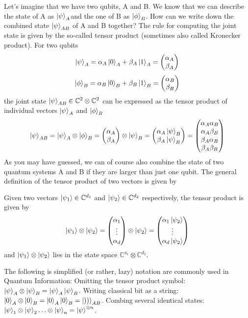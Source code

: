 Let’s imagine that we have two qubits, A and B. We know that we can describe the state of A
as $\ket{\psi}_A$and the one of B as $\ket{\phi}_B$. How can we write down the combined state $\ket{\psi}_{AB}$ of A and B together? The rule for computing the joint state is given by the so-called tensor product (sometimes also called Kronecker product). For two qubits
\[
\ket{\psi}_A=\alpha_A\ket{0}_A+\beta_A\ket{1}_A=\begin{pmatrix} \alpha_A \\ \beta_A \end{pmatrix}
\]
\[
\ket{\phi}_B=\alpha_B\ket{0}_B+\beta_B\ket{1}_B = \begin{pmatrix} \alpha_B \\ \beta_B\end{pmatrix}
\]
the joint state $\ket{\psi}_{AB} \in \mathbb{C}^2 \otimes \mathbb{C}^2$ can be expressed as the tensor product of individual vectors $\ket{\psi}_A$ and $\ket{\phi}_B$
\[
\ket{\psi}_{AB}=\ket{\psi}_A \otimes \ket{\phi}_B = \begin{pmatrix} \alpha_A \\ \beta_A \end{pmatrix} \otimes \ket{\psi}_B = \begin{pmatrix} \alpha_A \ket{\psi}_B \\ \beta_A\ket{\psi}_B \end{pmatrix} = \begin{pmatrix} \alpha_A \alpha_B \\ \alpha_A\beta_B \\ \beta_A\alpha_B\\ \beta_A\beta_B \end{pmatrix}
\]
As you may have guessed, we can of course also combine the state of two quantum systems A and
B if they are larger than just one qubit. The general definition of the tensor product of two vectors is given by
\begin{definition}
    Given two vectors $\ket{\psi_1} \in \mathbb{C}^{d_1}$ and $\ket{\psi_2}\in\mathbb{C}^{d_2}$ respectively, the tensor product is given by
    \[
    \ket{\psi_1}\otimes \ket{\psi_2}  = \begin{pmatrix} \alpha_1 \\ \vdots \\ \alpha_d \end{pmatrix} \otimes \ket{\psi_2} = \begin{pmatrix} \alpha_1\ket{\psi_2} \\ \vdots \\ \alpha_d\ket{\psi_2} \end{pmatrix}
    \]
    and $\ket{\psi_1}\otimes \ket{\psi_2}$ lies in the state space $\mathbb{C^{d_1}} \otimes \mathbb{C}^{d_2}$.
\end{definition}
The following is simplified (or rather, lazy) notation are commonly used in Quantum Information:
Omitting the tensor product symbol: $\ket{\psi}_A \otimes \ket{\psi}_B  =\ket{\psi}_A\ket{\psi}_B$. Writing classical bit as a string: $\ket{0}_A\otimes \ket{0}_B=\ket{0}_A\ket{0}_B=\ket{))}_{AB}$. Combing several identical states: $\ket{\psi}_1\otimes \ket{\psi}_2\ldots\otimes \ket{\psi}_n=\ket{\psi}^{\otimes n}$.

